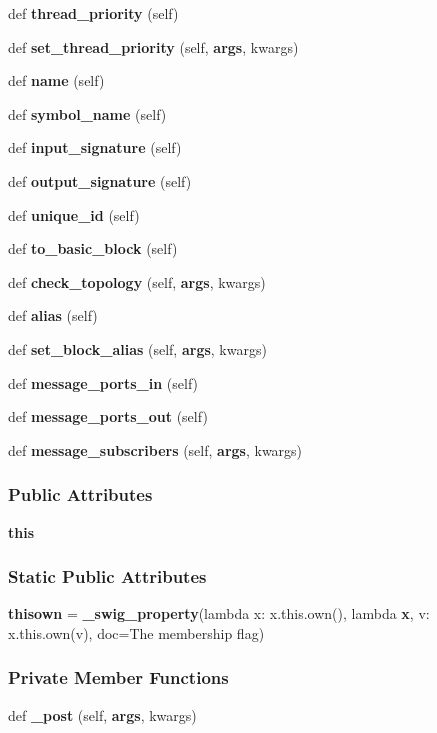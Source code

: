 \begin{DoxyCompactItemize}
\item 
def {\bf thread\+\_\+priority} (self)
\item 
def {\bf set\+\_\+thread\+\_\+priority} (self, {\bf args}, kwargs)
\item 
def {\bf name} (self)
\item 
def {\bf symbol\+\_\+name} (self)
\item 
def {\bf input\+\_\+signature} (self)
\item 
def {\bf output\+\_\+signature} (self)
\item 
def {\bf unique\+\_\+id} (self)
\item 
def {\bf to\+\_\+basic\+\_\+block} (self)
\item 
def {\bf check\+\_\+topology} (self, {\bf args}, kwargs)
\item 
def {\bf alias} (self)
\item 
def {\bf set\+\_\+block\+\_\+alias} (self, {\bf args}, kwargs)
\item 
def {\bf message\+\_\+ports\+\_\+in} (self)
\item 
def {\bf message\+\_\+ports\+\_\+out} (self)
\item 
def {\bf message\+\_\+subscribers} (self, {\bf args}, kwargs)
\end{DoxyCompactItemize}
\subsubsection*{Public Attributes}
\begin{DoxyCompactItemize}
\item 
{\bf this}
\end{DoxyCompactItemize}
\subsubsection*{Static Public Attributes}
\begin{DoxyCompactItemize}
\item 
{\bf thisown} = {\bf \+\_\+swig\+\_\+property}(lambda x\+: x.\+this.\+own(), lambda {\bf x}, v\+: x.\+this.\+own(v), doc=\textquotesingle{}The membership flag\textquotesingle{})
\end{DoxyCompactItemize}
\subsubsection*{Private Member Functions}
\begin{DoxyCompactItemize}
\item 
def {\bf \+\_\+post} (self, {\bf args}, kwargs)
\end{DoxyCompactItemize}
